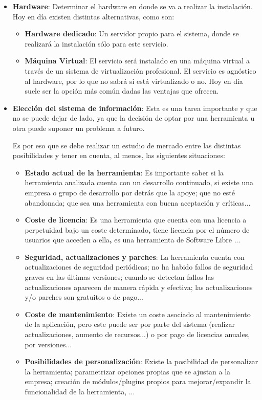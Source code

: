 \begin{itemize}
    \item \textbf{Hardware}: Determinar el hardware en donde se va a realizar la instalación. Hoy en día existen distintas alternativas, como son:
    \begin{itemize}
        \item \textbf{Hardware dedicado}: Un servidor propio para el sistema, donde se realizará la instalación sólo para este servicio.
        \item \textbf{Máquina Virtual}: El servicio será instalado en una máquina virtual a través de un sistema de virtualización profesional. El servicio es agnóstico al hardware, por lo que no sabrá si está virtualizado o no. Hoy en día suele ser la opción más común dadas las ventajas que ofrecen.
    \end{itemize}

    \item \textbf{Elección del sistema de información}: Esta es una tarea importante y que no se puede dejar de lado, ya que la decisión de optar por una herramienta u otra puede suponer un problema a futuro.

    Es por eso que se debe realizar un estudio de mercado entre las distintas posibilidades y tener en cuenta, al menos, las siguientes situaciones:

    \begin{itemize}
        \item \textbf{Estado actual de la herramienta}: Es importante saber si la herramienta analizada cuenta con un desarrollo continuado, si existe una empresa o grupo de desarrollo por detrás que la apoye; que no esté abandonada; que sea una herramienta con buena aceptación y críticas...
        \item \textbf{Coste de licencia}: Es una herramienta que cuenta con una licencia a perpetuidad bajo un coste determinado\textbf{,} tiene licencia por el número de usuarios que acceden a ella\textbf{,} es una herramienta de Software Libre ...
        \item \textbf{Seguridad, actualizaciones y parches}: La herramienta cuenta con actualizaciones de seguridad periódicas; no ha habido fallos de seguridad graves en las últimas versiones; cuando se detectan fallos las actualizaciones aparecen de manera rápida y efectiva; las actualizaciones y/o parches son gratuitos o de pago...
        \item \textbf{Coste de mantenimiento}: Existe un coste asociado al mantenimiento de la aplicación, pero este puede ser por parte del sistema (realizar actualizaciones, aumento de recursos...) o por pago de licencias anuales, por versiones...
        \item \textbf{Posibilidades de personalización}: Existe la posibilidad de personalizar la herramienta; parametrizar opciones propias que se ajustan a la empresa; creación de módulos/plugins propios para mejorar/expandir la funcionalidad de la herramienta, ...


\end{itemize}
\end{itemize}
